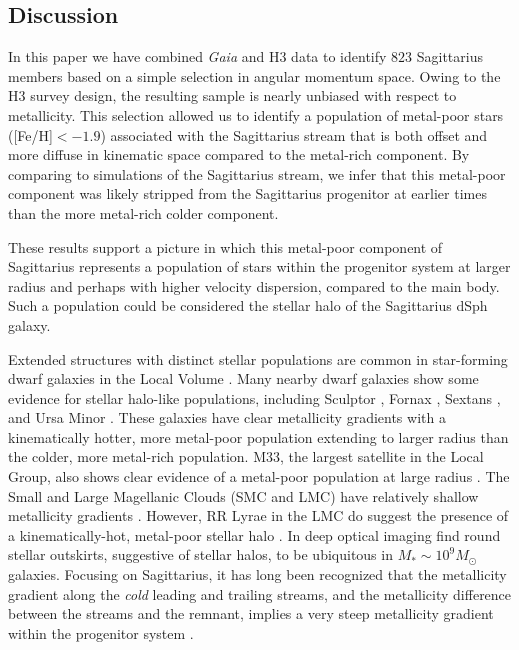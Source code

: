\documentclass[twocolumn,tighten,twocolappendix]{aastex63}
\newcommand{\sgr}{Sagittarius}
\newcommand{\Nsgr}{823}     %
\begin{document}
\begin{CJK*}{UTF8}{gbsn}
\section{Discussion}
\label{sec:discussion}

In this paper we have combined {\it Gaia} and H3 data to identify $\Nsgr$ \sgr{} members based on a simple selection in angular momentum space.  Owing to the H3 survey design, the resulting sample is nearly unbiased with respect to metallicity.  This selection allowed us to identify a population of metal-poor stars ([Fe/H]$<-1.9$) associated with the \sgr{} stream that is both offset and more diffuse in kinematic space compared to the metal-rich component.  By comparing to simulations of the \sgr{} stream, we infer that this metal-poor component was likely stripped from the \sgr{} progenitor at earlier times than the more metal-rich colder component.

These results support a picture in which this metal-poor component of \sgr{} represents a population of stars within the progenitor system at larger radius and perhaps with higher velocity dispersion, compared to the main body.  Such a population could be considered the stellar halo of the \sgr{} dSph galaxy.

Extended structures with distinct stellar populations are common in star-forming dwarf galaxies in the Local Volume \citep[see][and references therein]{Stinson09}. Many nearby dwarf galaxies show some evidence for stellar halo-like populations, including Sculptor \citep{Tolstoy04}, Fornax \citep{Battaglia06}, Sextans \citep{Battaglia11}, and Ursa Minor \citep{Pace20}.  These galaxies have clear metallicity gradients with a kinematically hotter, more metal-poor population extending to larger radius than the colder, more metal-rich population.  M33, the largest satellite in the Local Group, also shows clear evidence of a metal-poor population at large radius \citep{Cioni09}.  The Small and Large Magellanic Clouds (SMC and LMC) have relatively shallow metallicity gradients \citep{Cioni09}.  However, RR Lyrae in the LMC do suggest the presence of a kinematically-hot, metal-poor stellar halo \citep{Borissova06}.  In deep optical imaging \citet{Kado-Fong20} find round stellar outskirts, suggestive of stellar halos, to be ubiquitous in $M_\ast \sim 10^{9} M_\odot$ galaxies. Focusing on Sagittarius, it has long been recognized that the metallicity gradient along the {\it cold} leading and trailing streams, and the metallicity difference between the streams and the remnant, implies a very steep metallicity gradient within the progenitor system \citep[e.g.,][]{Bellazzini06, Chou07, LM10, Hayes20}.


\end{CJK*}
\end{document}
